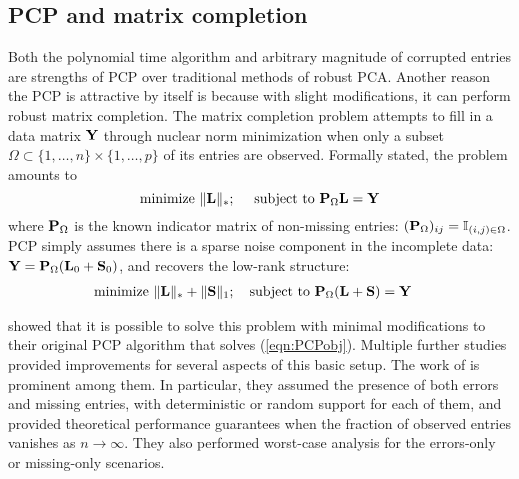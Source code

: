 \subsection*{\sffamily \large PCP and matrix completion}
Both the polynomial time algorithm and arbitrary magnitude of corrupted entries are strengths of PCP over traditional methods of robust PCA. Another reason the PCP is attractive by itself is because with slight modifications, it can perform robust matrix completion. The matrix completion problem attempts to fill in a data matrix ${\mathbf{Y}}$ through nuclear norm minimization when only a subset $\Omega \subset \{ 1, \ldots, n\} \times \{ 1, \ldots, p\}$ of its entries are observed. Formally stated, the problem amounts to
%
$$
\text{minimize } \| {\mathbf{L}} \|_*; \quad \text{ subject to } {\mathbf{P}}_\Omega {\mathbf{L}} = {\mathbf{Y}}
$$
%
where ${\mathbf{P}}_\Omega$ is the known indicator matrix of non-missing entries: $({\mathbf{P}}_\Omega)_{ij} = {\mathbb{I}}_{(i,j) \in \Omega}$. PCP simply assumes there is a sparse noise component in the incomplete data: ${\mathbf{Y}} = {\mathbf{P}}_\Omega ({\mathbf{L}}_0 + {\mathbf{S}}_0)$, and recovers the low-rank structure:
%
\begin{align}\label{eqn:PCPMCobj}
& \text{minimize } \| {\mathbf{L}} \|_* + \| {\mathbf{S}} \|_1; \quad \text{subject to } {\mathbf{P}}_\Omega({\mathbf{L}} + {\mathbf{S}}) = {\mathbf{Y}}
\end{align}
%

\cite{CandesEtal09} showed that it is possible to solve this problem with minimal modifications to their original PCP algorithm that solves (\ref{eqn:PCPobj}). Multiple further studies provided improvements for several aspects of this basic setup. The work of \cite{ChenEtal11} is prominent among them. In particular, they assumed the presence of both errors and missing entries, with deterministic or random support for each of them, and provided theoretical performance guarantees when the fraction of observed entries vanishes as $n \rightarrow \infty$. They also performed worst-case analysis for the errors-only or missing-only scenarios.

